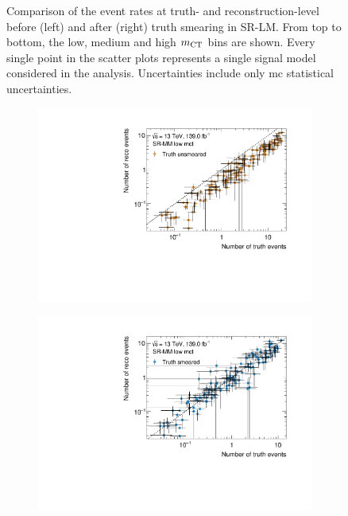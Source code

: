 \begin{figure}
\begin{subfigure}[b]{0.49\linewidth}
	\end{subfigure}
	\caption{Comparison of the event rates at truth- and reconstruction-level before (left) and after (right) truth smearing in SR-LM. From top to bottom, the low, medium and high $m_{\textrm{CT}}$ bins are shown. Every single point in the scatter plots represents a single signal model considered in the \onelepton analysis. Uncertainties include only \gls{mc} statistical uncertainties.}
	\label{fig:smearing_signal_regions_1}
\end{figure}

\begin{figure}
	\centering
	\begin{subfigure}[b]{0.49\linewidth}
		\centering\includegraphics[width=\textwidth]{yields_SR-MM_low_mct_unsmeared}
	\end{subfigure}\hfill
	\begin{subfigure}[b]{0.49\linewidth}
		\centering\includegraphics[width=\textwidth]{yields_SR-MM_low_mct_smeared}

\end{subfigure}
\end{figure}
